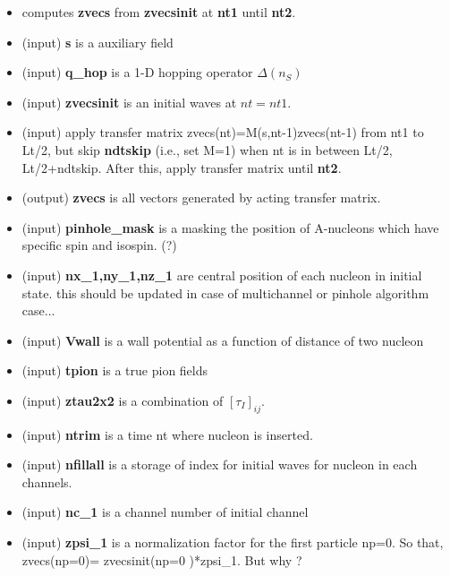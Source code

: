\documentclass[10pt]{book}
\begin{document}
\begin{itemize}
	\item computes {\bf zvecs} from {\bf zvecsinit} at {\bf nt1} until {\bf nt2}.
	\item (input) {\bf s} is a auxiliary field
	\item (input) {\bf q\_hop} is a 1-D hopping operator $\Delta(n_S)$
	\item (input) {\bf zvecsinit} is an initial waves at $nt=nt1$.
	\item (input) apply transfer matrix zvecs(nt)=M(s,nt-1)zvecs(nt-1) from nt1 
	              to Lt/2, but skip {\bf ndtskip} (i.e., set M=1) when 
	              nt is in between Lt/2, Lt/2+ndtskip. 
	              After this, apply transfer matrix until {\bf nt2}.		
	\item (output) {\bf zvecs} is all vectors generated by acting transfer matrix.
	\item (input) {\bf pinhole\_mask} is a masking the position of A-nucleons
	              which have specific spin and isospin. (?)
	\item (input) {\bf nx\_1,ny\_1,nz\_1} are central position of each nucleon in initial state. 
	               this should be updated in case of multichannel or pinhole algorithm case...
	\item (input) {\bf Vwall} is a wall potential as a function of distance of two nucleon
	\item (input) {\bf tpion} is a true pion fields 
	\item (input) {\bf ztau2x2} is a combination of $[\tau_I]_{ij} $.
	\item (input) {\bf ntrim} is a time nt where nucleon is inserted. 
	\item (input) {\bf nfillall} is a storage of index for initial waves for nucleon in each channels.
	\item (input) {\bf nc\_1}  is a channel number of initial channel
	\item (input) {\bf zpsi\_1} is a normalization factor for the first particle np=0. So that,
	              zvecs(np=0)= zvecsinit(np=0 )*zpsi\_1. But why ?                           
\end{itemize}
\end{document}
